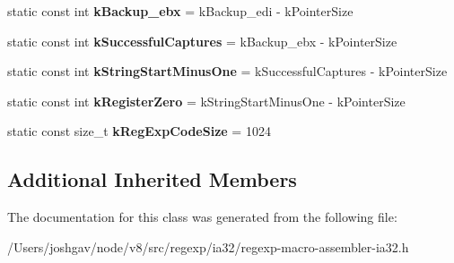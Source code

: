 \begin{DoxyCompactItemize}
\item 
static const int {\bfseries k\+Backup\+\_\+ebx} = k\+Backup\+\_\+edi -\/ k\+Pointer\+Size\hypertarget{classv8_1_1internal_1_1_reg_exp_macro_assembler_i_a32_ad9cdb8c7efa183a7f2bb3d40006b7053}{}\label{classv8_1_1internal_1_1_reg_exp_macro_assembler_i_a32_ad9cdb8c7efa183a7f2bb3d40006b7053}

\item 
static const int {\bfseries k\+Successful\+Captures} = k\+Backup\+\_\+ebx -\/ k\+Pointer\+Size\hypertarget{classv8_1_1internal_1_1_reg_exp_macro_assembler_i_a32_aff1888f97b16781ddeb4783344c2959c}{}\label{classv8_1_1internal_1_1_reg_exp_macro_assembler_i_a32_aff1888f97b16781ddeb4783344c2959c}

\item 
static const int {\bfseries k\+String\+Start\+Minus\+One} = k\+Successful\+Captures -\/ k\+Pointer\+Size\hypertarget{classv8_1_1internal_1_1_reg_exp_macro_assembler_i_a32_a96d5b08a3d2403f709384cca3c65b736}{}\label{classv8_1_1internal_1_1_reg_exp_macro_assembler_i_a32_a96d5b08a3d2403f709384cca3c65b736}

\item 
static const int {\bfseries k\+Register\+Zero} = k\+String\+Start\+Minus\+One -\/ k\+Pointer\+Size\hypertarget{classv8_1_1internal_1_1_reg_exp_macro_assembler_i_a32_a65e26ac83765470d30ce4ee6ee240a2d}{}\label{classv8_1_1internal_1_1_reg_exp_macro_assembler_i_a32_a65e26ac83765470d30ce4ee6ee240a2d}

\item 
static const size\+\_\+t {\bfseries k\+Reg\+Exp\+Code\+Size} = 1024\hypertarget{classv8_1_1internal_1_1_reg_exp_macro_assembler_i_a32_a5578dba92ea32c4d86152add4cba1b79}{}\label{classv8_1_1internal_1_1_reg_exp_macro_assembler_i_a32_a5578dba92ea32c4d86152add4cba1b79}

\end{DoxyCompactItemize}
\subsection*{Additional Inherited Members}


The documentation for this class was generated from the following file\+:\begin{DoxyCompactItemize}
\item 
/\+Users/joshgav/node/v8/src/regexp/ia32/regexp-\/macro-\/assembler-\/ia32.\+h\end{DoxyCompactItemize}
